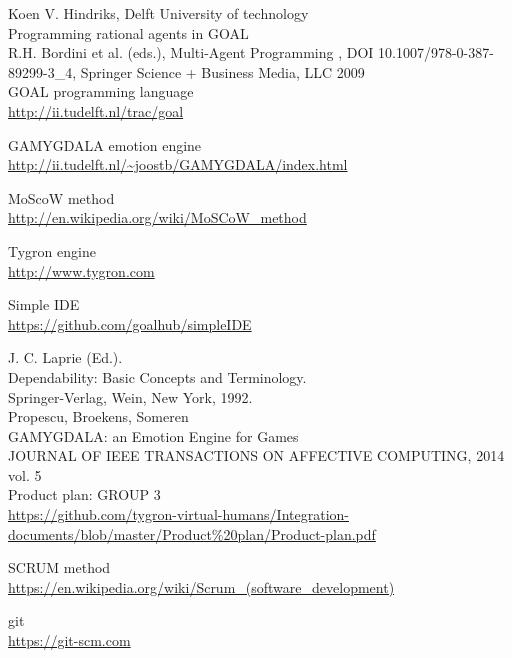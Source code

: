 \documentclass[11pt]{article}
\begin{document}
\clearpage

\printglossaries

\clearpage

\begin{thebibliography}{9}
	Koen V. Hindriks, Delft University of technology\\
	Programming rational agents in GOAL\\
	R.H. Bordini et al. (eds.), Multi-Agent Programming , DOI 10.1007/978-0-387-89299-3\_4, Springer Science + Business Media, LLC 2009 \\

	GOAL programming language\\
	\url{http://ii.tudelft.nl/trac/goal}
	
	GAMYGDALA emotion engine\\
	\url{http://ii.tudelft.nl/~joostb/GAMYGDALA/index.html}
	
	MoScoW method\\
	\url{http://en.wikipedia.org/wiki/MoSCoW_method }
	
	Tygron engine\\
	\url{http://www.tygron.com }
	
	Simple IDE\\
	\url{https://github.com/goalhub/simpleIDE }
	
	J. C. Laprie (Ed.).\\ 
	Dependability: Basic Concepts and Terminology. \\
	Springer-Verlag, Wein, New York, 1992.\\

	Propescu, Broekens, Someren\\
	GAMYGDALA: an Emotion Engine for Games\\
	JOURNAL OF IEEE TRANSACTIONS ON AFFECTIVE COMPUTING, 2014 vol. 5\\

	Product plan: GROUP 3\\
	\url{https://github.com/tygron-virtual-humans/Integration-documents/blob/master/Product\%20plan/Product-plan.pdf}
	
	SCRUM method\\
	\url{https://en.wikipedia.org/wiki/Scrum_(software_development)}
	
	git\\
	\url{https://git-scm.com }
	

\end{thebibliography}
\end{document}
